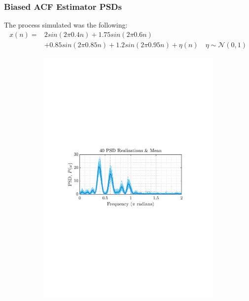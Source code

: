 \documentclass[12pt]{article}
\numberwithin{equation}{section}
\begin{document}
	\subsubsection{Biased ACF Estimator PSDs}

	The process simulated was the following:
	\begin{equation}
		\begin{aligned}
		x(n) = & 2 sin(2 \pi 0.4 n) + 1.75 sin(2 \pi 0.6 n) \\
		&  + 0.85 sin(2 \pi 0.85 n) + 1.2 sin(2 \pi 0.95 n) + \eta(n) \quad \eta \sim \mathcal{N}(0, 1)
		\end{aligned}
	\end{equation}
	
	

	\begin{figure}[H]
		\centering
		\begin{subfigure}{0.49\textwidth}
			\centering
			\includegraphics[trim={2.2cm 11.2cm 3.15cm  11.2cm}, clip, width=\textwidth]{../MATLAB/figures/q1_3b_fig01.pdf} 

\end{subfigure}
\end{figure}
\end{document}
